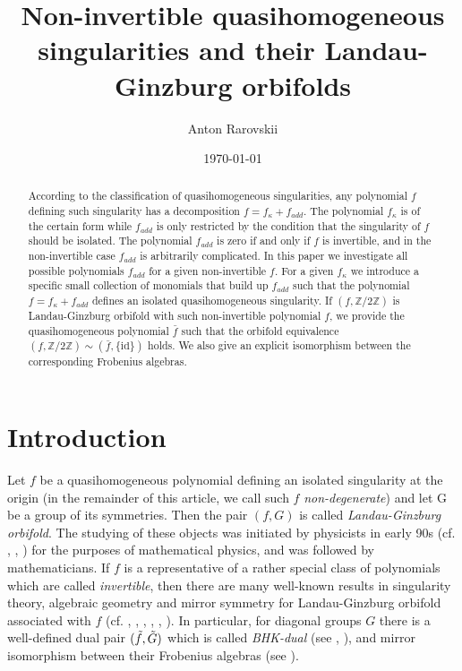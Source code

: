 \documentclass[reqno,12pt]{amsart}
\numberwithin{equation}{section}
\theoremstyle{plain}
\theoremstyle{definition}
\newcommand{\ZZ}{{\mathbb{Z}}}
\newcommand{\id}{\mathrm{id}}
\begin{document}
\title[Non-invertible singularities and their Landau-Ginzburg orbifolds]{Non-invertible quasihomogeneous singularities and their Landau-Ginzburg orbifolds}  
\date{\today}
\author{Anton Rarovskii}
\address{\newline Faculty of Mathematics, National Research University Higher School of Economics, Usacheva str., 6, 119048 Moscow, Russian Federation, and \newline
Skolkovo Institute of Science and Technology, Nobelya str., 3, 121205 Moscow, Russian Federation}
\begin{abstract}
     According to the classification of quasihomogeneous singularities, any polynomial $f$ defining such singularity has a decomposition $f = f_\kappa + f_{add}$. The polynomial $f_\kappa$ is of the certain form while $f_{add}$ is only restricted by the condition that the singularity of $f$ should be isolated. The polynomial $f_{add}$ is zero if and only if $f$ is invertible, and in the non-invertible case $f_{add}$ is arbitrarily complicated. In this paper we investigate all possible polynomials $f_{add}$ for a given non-invertible $f$. For a given $f_\kappa$ we introduce a specific small collection of monomials that build up $f_{add}$ such that the polynomial $f = f_\kappa + f_{add}$ defines an isolated quasihomogeneous singularity. If $(f,\ZZ/2\ZZ)$ is Landau-Ginzburg orbifold with such non-invertible polynomial $f$, we provide the quasihomogeneous polynomial $\bar{f}$ such that the orbifold equivalence $(f,\ZZ/2\ZZ) \sim (\bar{f}, \{\id\})$ holds. We also give an explicit isomorphism between the corresponding Frobenius algebras.
\end{abstract}
\maketitle
\setcounter{tocdepth}{1}
\section{Introduction}
Let $f$ be a quasihomogeneous polynomial defining an isolated singularity at the origin (in the remainder of this
article, we call such $f$
\textit{non-degenerate}) and let G be a group of its symmetries.  
Then the pair $(f,G)$ is called \emph{Landau-Ginzburg orbifold}. The studying of these objects was initiated by physicists in early 90s (cf. \cite{IV}, \cite{V}, \cite{Witt}) for the purposes of mathematical physics, and was followed by mathematicians. If $f$ is a representative of a rather special class of polynomials which are called \emph{invertible}, then there are many well-known results in singularity theory, algebraic geometry and mirror symmetry for Landau-Ginzburg orbifold associated with $f$ (cf. \cite{BT1}, \cite{BTW2}, \cite{EGZ}, \cite{BI}, \cite{FJJS}, \cite{KPA}). In particular, for diagonal groups $G$ there is a well-defined dual pair $(\Tilde{f},\Tilde{G})$ which is called \emph{BHK-dual} (see \cite{BHu}, \cite{BHe}), and mirror isomorphism between their Frobenius algebras (see \cite{Kr}). 
\end{document}
